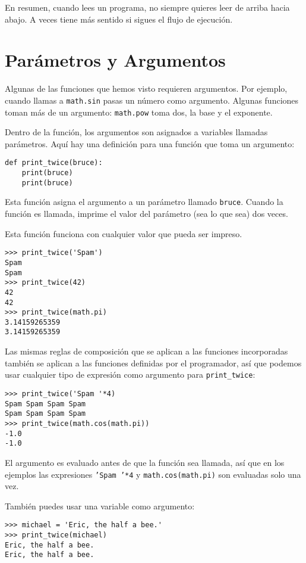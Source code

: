En resumen, cuando lees un programa, no siempre quieres leer de arriba hacia abajo. A veces tiene más sentido si sigues el flujo de ejecución.

\section{Parámetros y Argumentos}

Algunas de las funciones que hemos visto requieren argumentos. Por ejemplo, cuando llamas a \texttt{math.sin} pasas un número como argumento. Algunas funciones toman más de un argumento: \texttt{math.pow} toma dos, la base y el exponente.

Dentro de la función, los argumentos son asignados a variables llamadas parámetros. Aquí hay una definición para una función que toma un argumento:

\begin{lstlisting}
def print_twice(bruce):
    print(bruce)
    print(bruce)
\end{lstlisting}

Esta función asigna el argumento a un parámetro llamado \texttt{bruce}. Cuando la función es llamada, imprime el valor del parámetro (sea lo que sea) dos veces.

Esta función funciona con cualquier valor que pueda ser impreso.

\begin{lstlisting}
>>> print_twice('Spam')
Spam
Spam
>>> print_twice(42)
42
42
>>> print_twice(math.pi)
3.14159265359
3.14159265359
\end{lstlisting}

Las mismas reglas de composición que se aplican a las funciones incorporadas también se aplican a las funciones definidas por el programador, así que podemos usar cualquier tipo de expresión como argumento para \texttt{print\_twice}:

\begin{lstlisting}
>>> print_twice('Spam '*4)
Spam Spam Spam Spam 
Spam Spam Spam Spam 
>>> print_twice(math.cos(math.pi))
-1.0
-1.0
\end{lstlisting}

El argumento es evaluado antes de que la función sea llamada, así que en los ejemplos las expresiones \texttt{'Spam '*4} y \texttt{math.cos(math.pi)} son evaluadas solo una vez.

También puedes usar una variable como argumento:

\begin{lstlisting}
>>> michael = 'Eric, the half a bee.'
>>> print_twice(michael)
Eric, the half a bee.
Eric, the half a bee.
\end{lstlisting}

